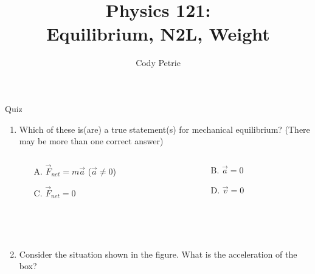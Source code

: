 \documentclass{beamer}
\title[{\color{white}{Chapters 6.1-3}}]{Physics 121: \\ Equilibrium, N2L, Weight}
\author{Cody Petrie}
\institute{Mesa Community College}
\date{}
\begin{document}
\begin{frame}
\titlepage
\end{frame}



\begin{frame}{Quiz}
\begin{enumerate}
   \item Which of these is(are) a true statement(s) for mechanical equilibrium? (There may be more than one correct answer)
   \begin{columns}
      \begin{column}{0.5\textwidth}
      \begin{enumerate}
         \item[A.] $\vec{F}_{net} = m\vec{a}$ ($\vec{a} \ne 0$)
         \item[C.] $\vec{F}_{net} = 0$
      \end{enumerate}
      \end{column}
      \begin{column}{0.5\textwidth}
      \begin{enumerate}
         \item[B.] $\vec{a}=0$
         \item[D.] $\vec{v}=0$
      \end{enumerate}
      \end{column}
   \end{columns}
   ~\\~
   \item Consider the situation shown in the figure. What is the acceleration of the box?
   \begin{columns}
   \begin{column}{0.35\textwidth}
   \begin{center}

\end{center}
\end{column}
\end{columns}
\end{enumerate}
\end{frame}
\end{document}
